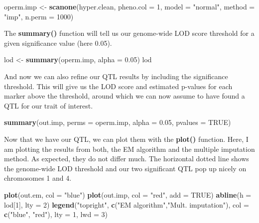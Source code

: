 \documentclass[12pt,]{krantz}
\newenvironment{Shaded}{\begin{snugshade}}{\end{snugshade}}
\newcommand{\KeywordTok}[1]{\textcolor[rgb]{0.27,0.27,0.27}{\textbf{{#1}}}}
\newcommand{\DataTypeTok}[1]{\textcolor[rgb]{0.27,0.27,0.27}{{#1}}}
\newcommand{\DecValTok}[1]{\textcolor[rgb]{0.06,0.06,0.06}{{#1}}}
\newcommand{\FloatTok}[1]{\textcolor[rgb]{0.06,0.06,0.06}{{#1}}}
\newcommand{\StringTok}[1]{\textcolor[rgb]{0.5,0.5,0.5}{{#1}}}
\newcommand{\OtherTok}[1]{\textcolor[rgb]{0.37,0.37,0.37}{{#1}}}
\newcommand{\NormalTok}[1]{{#1}}
\begin{document}
\begin{Shaded}
\begin{Highlighting}[]
\NormalTok{operm.imp <-}\StringTok{ }\KeywordTok{scanone}\NormalTok{(hyper.clean, }\DataTypeTok{pheno.col =} \DecValTok{1}\NormalTok{, }\DataTypeTok{model =} \StringTok{"normal"}\NormalTok{, }
                     \DataTypeTok{method =} \StringTok{"imp"}\NormalTok{, }\DataTypeTok{n.perm =} \DecValTok{1000}\NormalTok{)}
\end{Highlighting}
\end{Shaded}

The \textbf{summary()} function will tell us our genome-wide LOD score
threshold for a given significance value (here 0.05).

\begin{Shaded}
\begin{Highlighting}[]
\NormalTok{lod <-}\StringTok{ }\KeywordTok{summary}\NormalTok{(operm.imp, }\DataTypeTok{alpha =} \FloatTok{0.05}\NormalTok{)}
\NormalTok{lod}
\end{Highlighting}
\end{Shaded}

And now we can also refine our QTL results by including the significance
threshold. This will give us the LOD score and estimated p-values for
each marker above the threshold, around which we can now assume to have
found a QTL for our trait of interest.

\begin{Shaded}
\begin{Highlighting}[]
\KeywordTok{summary}\NormalTok{(out.imp, }\DataTypeTok{perms =} \NormalTok{operm.imp, }\DataTypeTok{alpha =} \FloatTok{0.05}\NormalTok{, }\DataTypeTok{pvalues =} \OtherTok{TRUE}\NormalTok{)}
\end{Highlighting}
\end{Shaded}

Now that we have our QTL, we can plot them with the \textbf{plot()}
function. Here, I am plotting the results from both, the EM algorithm
and the multiple imputation method. As expected, they do not differ
much. The horizontal dotted line shows the genome-wide LOD threshold and
our two significant QTL pop up nicely on chromosomes 1 and 4.

\begin{Shaded}
\begin{Highlighting}[]
\KeywordTok{plot}\NormalTok{(out.em, }\DataTypeTok{col =} \StringTok{"blue"}\NormalTok{)}
\KeywordTok{plot}\NormalTok{(out.imp, }\DataTypeTok{col =} \StringTok{"red"}\NormalTok{, }\DataTypeTok{add =} \OtherTok{TRUE}\NormalTok{)}
\KeywordTok{abline}\NormalTok{(}\DataTypeTok{h =} \NormalTok{lod[}\DecValTok{1}\NormalTok{], }\DataTypeTok{lty =} \DecValTok{2}\NormalTok{)}
\KeywordTok{legend}\NormalTok{(}\StringTok{"topright"}\NormalTok{, }\KeywordTok{c}\NormalTok{(}\StringTok{"EM algorithm"}\NormalTok{,}\StringTok{"Mult. imputation"}\NormalTok{), }
       \DataTypeTok{col =} \KeywordTok{c}\NormalTok{(}\StringTok{"blue"}\NormalTok{, }\StringTok{"red"}\NormalTok{), }\DataTypeTok{lty =} \DecValTok{1}\NormalTok{, }\DataTypeTok{lwd =} \DecValTok{3}\NormalTok{)}
\end{Highlighting}
\end{Shaded}
\end{document}
